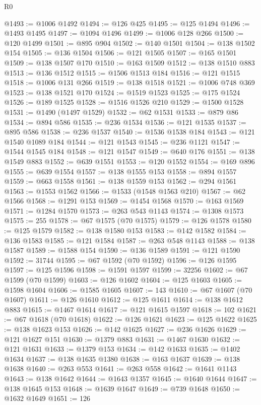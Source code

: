 \begin{lexlean}{R0}
\begin{coremodule}
@1493 := @1006 @1492
@1494 := @126 @425
@1495 := @125 @1494
@1496 := @1493 @1495
@1497 := @1094 @1496
@1499 := @1006 @128 @266
@1500 := @120 @1499
@1501 := @895 @904
@1502 := @140 @1501
@1504 := @138 @1502 @154
@1505 := @136 @1504
@1506 := @121 @1505
@1507 := @165 @1501
@1509 := @138 @1507 @170
@1510 := @163 @1509
@1512 := @138 @1510 @883
@1513 := @136 @1512
@1515 := @1506 @1513 @184
@1516 := @121 @1515
@1518 := @1006 @131 @266
@1519 := @138 @1518
@1521 := @1006 @748 @369
@1523 := @138 @1521 @170
@1524 := @1519 @1523
@1525 := @175 @1524
@1526 := @189 @1525
@1528 := @1516 @1526 @210
@1529 := @1500 @1528
@1531 := @1490 (@1497 @1529)
@1532 := @62 @1531
@1533 := @879 @86
@1534 := @894 @586
@1535 := @236 @1534
@1536 := @121 @1535
@1537 := @895 @586
@1538 := @236 @1537
@1540 := @1536 @1538 @184
@1543 := @121 @1540 @1089 @184
@1544 := @121 @1543
@1545 := @236 @1121
@1547 := @1544 @1545 @184
@1548 := @121 @1547
@1549 := @640 @176
@1551 := @138 @1549 @883
@1552 := @639 @1551
@1553 := @120 @1552
@1554 := @169 @896
@1555 := @639 @1554
@1557 := @138 @1555 @153
@1558 := @894 @1557
@1559 := @663 @1558
@1561 := @138 @1559 @153
@1562 := @294 @1561
@1563 := @1553 @1562
@1566 := @1533 (@1548 @1563 @210)
@1567 := @62 @1566
@1568 := @1291 @153
@1569 := @1454 @1568
@1570 := @163 @1569
@1571 := @1284 @1570
@1573 := @263 @543 @1143
@1574 := @1308 @1573
@1575 := 255
@1578 := @67 @1575 (@70 @1575)
@1579 := @126 @1578
@1580 := @125 @1579
@1582 := @138 @1580 @153
@1583 := @142 @1582
@1584 := @136 @1583
@1585 := @121 @1584
@1587 := @263 @548 @1143
@1588 := @138 @1587
@1589 := @1588 @154
@1590 := @136 @1589
@1591 := @121 @1590
@1592 := 31744
@1595 := @67 @1592 (@70 @1592)
@1596 := @126 @1595
@1597 := @125 @1596
@1598 := @1591 @1597
@1599 := 32256
@1602 := @67 @1599 (@70 @1599)
@1603 := @126 @1602
@1604 := @125 @1603
@1605 := @1598 @1604
@1606 := @1585 @1605
@1607 := 143
@1610 := @67 @1607 (@70 @1607)
@1611 := @126 @1610
@1612 := @125 @1611
@1614 := @138 @1612 @883
@1615 := @1467 @1614
@1617 := @121 @1615 @1597
@1618 := 102
@1621 := @67 @1618 (@70 @1618)
@1622 := @126 @1621
@1623 := @125 @1622
@1625 := @138 @1623 @153
@1626 := @142 @1625
@1627 := @236 @1626
@1629 := @121 @1627 @151
@1630 := @1379 @883
@1631 := @1467 @1630
@1632 := @121 @1631
@1633 := @1379 @153
@1634 := @142 @1633
@1635 := @1402 @1634
@1637 := @138 @1635 @1380
@1638 := @163 @1637
@1639 := @138 @1638
@1640 := @263 @553
@1641 := @263 @558
@1642 := @1641 @1143
@1643 := @138 @1642
@1644 := @1643 @1357
@1645 := @1640 @1644
@1647 := @138 @1645 @153
@1648 := @1639 @1647
@1649 := @739 @1648
@1650 := @1632 @1649
@1651 := 126

\end{coremodule}
\end{lexlean}

